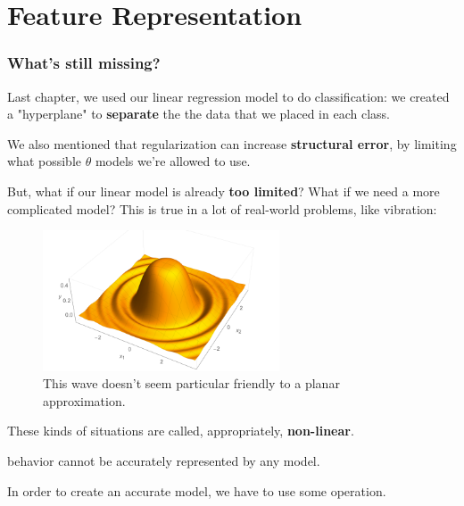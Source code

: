 
\setcounter{chapter}{5-1}

\chapter{Feature Representation}

    \subsection*{What's still missing?}
    
        Last chapter, we used our linear regression model to do classification: we created a "hyperplane" to \textbf{separate} the the data that we placed in each class. 
    
        We also mentioned that regularization can increase \textbf{structural error}, by limiting what possible $\theta$ models we're allowed to use. 
    
        But, what if our linear model is already \textbf{too limited}? What if we need a more complicated model? This is true in a lot of real-world problems, like vibration:
    
        \begin{figure}[H]
            \centering
            
            \includegraphics[width=70mm,scale=0.5]{images/feature_images/nonlinear_example.png}
            \caption*{This wave doesn't seem particular friendly to a planar approximation.}
        \end{figure}
    
        These kinds of situations are called, appropriately, \textbf{non-linear}.\\
    
        \begin{concept}
             behavior cannot be accurately represented by any  model. 
    
            In order to create an accurate model, we have to use some  operation.
        \end{concept}
    

